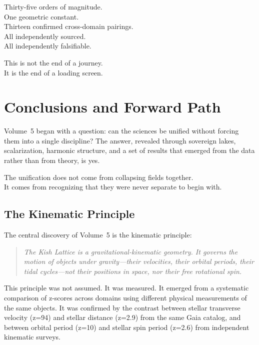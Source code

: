 \documentclass[11pt, letterpaper, openany]{book}
\begin{document}
Thirty-five orders of magnitude.\\
One geometric constant.\\
Thirteen confirmed cross-domain pairings.\\
All independently sourced.\\
All independently falsifiable.

This is not the end of a journey.\\
It is the end of a loading screen.

\chapter{Conclusions and Forward Path}

Volume~5 began with a question: can the sciences be unified without forcing them into a single
discipline? The answer, revealed through sovereign lakes, scalarization, harmonic structure,
and a set of results that emerged from the data rather than from theory, is yes.

The unification does not come from collapsing fields together.\\
It comes from recognizing that they were never separate to begin with.

\section*{The Kinematic Principle}

The central discovery of Volume~5 is the kinematic principle:

\begin{quote}
\textit{The Kish Lattice is a gravitational-kinematic geometry. It governs the motion of
objects under gravity---their velocities, their orbital periods, their tidal cycles---not their
positions in space, nor their free rotational spin.}
\end{quote}

This principle was not assumed. It was measured. It emerged from a systematic comparison of
z-scores across domains using different physical measurements of the same objects. It was
confirmed by the contrast between stellar transverse velocity (z=94) and stellar distance
(z=2.9) from the same Gaia catalog, and between orbital period (z=10) and stellar spin
period (z=2.6) from independent kinematic surveys.
\end{document}
